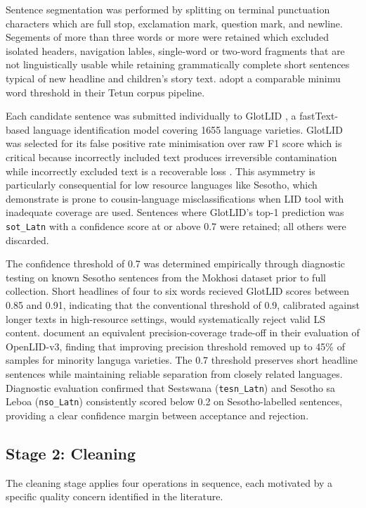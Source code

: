 \documentclass[11pt,a4paper]{article}
\begin{document}
Sentence segmentation was performed by splitting on terminal punctuation characters which are full stop, exclamation mark, question mark, and newline. Segements of more than three words or more were retained which excluded isolated headers, navigation lables, single-word or two-word fragments that are not linguistically usable while retaining grammatically complete short sentences typical of new headline and children's story text. \citep{de2024data} adopt a comparable minimu word threshold in their Tetun corpus pipeline.

Each candidate sentence was submitted individually to GlotLID \citep{kargaran2024glotcc}, a fastText-based language identification model covering 1655 language varieties. GlotLID was selected for its false positive rate minimisation over raw F1 score which is critical because incorrectly included text produces irreversible contamination while incorrectly excluded text is a recoverable loss \citep{kreutzer-etal-2022-quality}. This asymmetry is particularly consequential for low resource languages like Sesotho, which \citet{kargaran2024glotcc} demonstrate is prone to cousin-language misclassifications when LID tool with inadequate coverage are used. Sentences where GlotLID's top-1 prediction was \texttt{sot\_Latn} with a confidence score at or above 0.7 were retained; all others were discarded.

The confidence threshold of 0.7 was determined empirically through diagnostic testing on known Sesotho sentences from the Mokhosi dataset prior to full collection. Short headlines of four to six words recieved GlotLID scores between 0.85 and 0.91, indicating that the conventional threshold of 0.9, calibrated against longer texts in high-resource settings, would systematically reject valid LS content. \citet{fedorova2026openlid} document an equivalent precision-coverage trade-off in their evaluation of OpenLID-v3, finding that improving precision threshold removed up to 45\% of samples for minority languga varieties. The 0.7 threshold preserves short headline sentences while maintaining reliable separation from closely related languages. Diagnostic  evaluation confirmed that Sestswana (\texttt{tesn\_Latn}) and Sesotho sa Leboa (\texttt{nso\_Latn}) consistently scored below 0.2 on Sesotho-labelled sentences, providing a clear confidence margin between acceptance and rejection.
\subsection{Stage 2: Cleaning}
The cleaning stage applies four operations in sequence, each
motivated by a specific quality concern identified in the literature.
\end{document}
